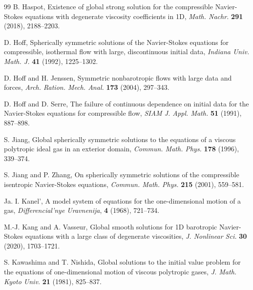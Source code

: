 \documentclass[11pt,reqno]{amsart}
\numberwithin{rk}{section}
\numberwithin{prop}{section}
\numberwithin{mydef}{section}
\numberwithin{lem}{section}
\numberwithin{equation}{section}
\numberwithin{thm}{section}
\begin{document}
\begin{thebibliography}{99}
  B. Haspot, Existence of global strong solution for the compressible {N}avier-{S}tokes equations with degenerate viscosity coefficients in 1{D}, \textit{Math. Nachr.} \textbf{291} (2018), 2188--2203.





 D. Hoff,  Spherically symmetric solutions of the {N}avier-{S}tokes equations for compressible, isothermal flow with large, discontinuous initial data,
\textit{ Indiana Univ. Math. J.} \textbf{41} (1992), 1225--1302.




 
 D. Hoff and H. Jenssen,  Symmetric nonbarotropic flows with large data and forces, \textit{ Arch. Ration. Mech. Anal.}  \textbf{173} (2004), 297--343.




 D. Hoff and  D. Serre,  The failure of continuous dependence on initial data for the   Navier-Stokes equations for compressible flow, \textit{ SIAM J. Appl. Math.} \textbf{51} (1991), 887--898.





 S. Jiang,  Global spherically symmetric solutions to the equations of a viscous polytropic ideal gas in an exterior domain, \textit{Commun. Math. Phys.} \textbf{178} (1996),  339--374.


 S. Jiang and P. Zhang, On spherically symmetric solutions of the compressible isentropic Navier-Stokes equations, \textit{Commun. Math. Phys.} \textbf{215} (2001), 559--581.





 Ja. I. Kanel', A model system of equations for the one-dimensional motion of a gas, \textit{Differencial'nye Uravnenija}, \textbf{4} (1968), 721--734.
              
              
 M.-J. Kang and A. Vasseur, Global smooth solutions for 1{D} barotropic {N}avier-{S}tokes equations with a large class of degenerate viscosities, \textit{J. Nonlinear Sci.} \textbf{30} (2020), 1703--1721.



 S. Kawashima and T. Nishida, Global solutions to the initial value problem for the equations of one-dimensional motion of viscous polytropic gases,  \textit {J. Math. Kyoto Univ.} \textbf{21} (1981), 825--837.


\end{thebibliography}
\end{document}
